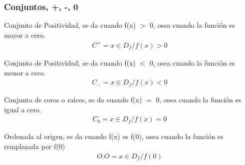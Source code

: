 \documentclass{article}
\begin{document}
	\subsubsection*{Conjuntos, +, -, 0}
	
	\begin{frm-thm}
		Conjunto de Positividad, se da cuando f(x) $>$ 0, osea cuando la función es  mayor a cero.
		\begin{gather*}
			C^{+} = {x \in D_f / f(x)>0}
		\end{gather*}
	\end{frm-thm}
		\begin{frm-thm}
		Conjunto de Positividad, se da cuando f(x) $<$ 0, osea cuando la función es  menor a cero.
		\begin{gather*}
			C_{-}  = {x \in D_f / f(x)<0}
		\end{gather*}
	\end{frm-thm}
	\begin{frm-thm}
		Conjunto de ceros o raíces, se da cuando f(x) $=$ 0, osea cuando la función es  igual a cero.
		\begin{gather*}
			C_{0} = {x \in D_f / f(x)=0}
		\end{gather*}
	\end{frm-thm}
	\begin{frm-thm}
	  Ordenada al origen, se da cuando f(x) es f(0), osea cuando la función es remplazada por f(0)
		\begin{gather*}
			O.O = {x \in D_f / f(0)}
		\end{gather*}
	\end{frm-thm}
	\hspace{0.5cm}
\end{document}
